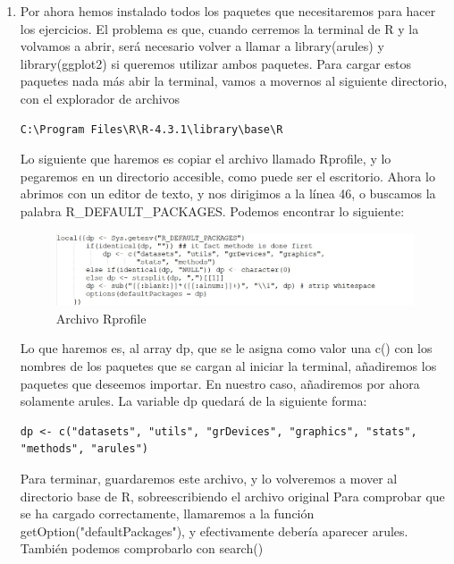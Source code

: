 \documentclass[parskip=full]{scrartcl}
\begin{document}
\begin{enumerate}
Nos notificará al cargarlo con library de que necesita el paquete generics. Lo instalaremos y después cargaremos otra vez arules. Debería funionar

\begin{Schunk}
\begin{Sinput}
> install.packages("generics")
> library(arules)
\end{Sinput}
\end{Schunk}


\item
Por ahora hemos instalado todos los paquetes que necesitaremos para hacer los ejercicios. El problema es que, cuando cerremos la terminal de R y la volvamos a abrir, será necesario volver a llamar a library(arules) y library(ggplot2) si queremos utilizar ambos paquetes. Para cargar estos paquetes nada más abir la terminal, vamos a movernos al siguiente directorio, con el explorador de archivos
\begin{verbatim}
C:\Program Files\R\R-4.3.1\library\base\R
\end{verbatim}
Lo siguiente que haremos es copiar el archivo llamado Rprofile, y lo pegaremos en un directorio accesible, como puede ser el escritorio. Ahora lo abrimos con un editor de texto, y nos dirigimos a la línea 46, o buscamos la palabra R\_DEFAULT\_PACKAGES. Podemos encontrar lo siguiente:
\begin{figure}[H]
\centering
\includegraphics[width=0.8\linewidth]{images/Default_packages.jpeg}
\caption{\label{fig:default_packages}Archivo Rprofile}
\end{figure}
Lo que haremos es, al array dp, que se le asigna como valor una c() con los nombres de los paquetes que se cargan al iniciar la terminal, añadiremos los paquetes que deseemos importar. En nuestro caso, añadiremos por ahora solamente arules. La variable dp quedará de la siguiente forma:
\begin{verbatim}
dp <- c("datasets", "utils", "grDevices", "graphics", "stats",
"methods", "arules")
\end{verbatim}
Para terminar, guardaremos este archivo, y lo volveremos a mover al directorio base de R, sobreescribiendo el archivo original
Para comprobar que se ha cargado correctamente, llamaremos a la función getOption("defaultPackages"), y efectivamente debería aparecer arules. También podemos comprobarlo con search()

\end{enumerate}
\end{document}
